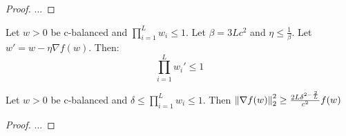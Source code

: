 \begin{proof}
    ... 
\end{proof}


\begin{lemma}
    Let \(w > 0\) be c-balanced and \(\prod_{i=1}^L w_i \leq 1\). Let \(\beta = 3 L c^2\) 
    and \(\eta \leq \frac{1}{\beta}\). Let \(w' = w - \eta \nabla f(w)\). Then: 
    \[
        \prod_{i=1}^L w_i' \leq 1   
    \]
\end{lemma}

\begin{lemma}[\(\alpha\)-PL]
    Let \(w > 0\) be c-balanced and \(\delta \leq \prod_{i=1}^L w_i \leq 1\). 
    Then \(\norm{\nabla f(w)}_2^2 \geq \frac{2 L \delta^{2 - \frac{2}{L}}}{c^2} f(w)\)
\end{lemma}

\begin{proof}
    ...
\end{proof}